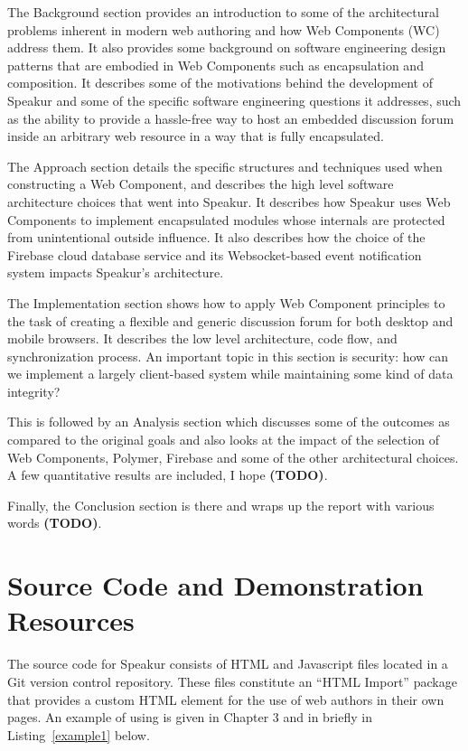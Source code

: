 The Background section provides an introduction to some of the architectural problems inherent in modern web authoring and how Web Components (WC) address them. 
It also provides some background on software engineering design patterns that are embodied in Web Components such as encapsulation and composition.
It describes some of the motivations behind the development of Speakur and some of the specific software engineering questions it addresses, such as the ability to provide a hassle-free way to host an embedded discussion forum inside an arbitrary web resource in a way that is fully encapsulated.

The Approach section details the specific structures and techniques used when constructing a Web Component, and describes the high level software architecture choices that went into Speakur. 
It describes how Speakur uses Web Components to implement encapsulated modules whose internals are protected from unintentional outside influence. 
It also describes how the choice of the Firebase cloud database service and its Websocket-based event notification system impacts Speakur's architecture.

The Implementation section shows how to apply Web Component principles to the task of creating a flexible and generic discussion forum for both desktop and mobile browsers. 
It describes the low level architecture, code flow, and synchronization process.
An important topic in this section is security: how can we implement a largely client-based system while maintaining some kind of data integrity?

This is followed by an Analysis section which discusses some of the outcomes as compared to the original goals and also looks at the impact of the selection of Web Components, Polymer, Firebase and some of the other architectural choices. 
A few quantitative results are included, I hope \textbf{(TODO)}.

Finally, the Conclusion section is there and wraps up the report with various words \textbf{(TODO)}. 

\section{Source Code and Demonstration Resources}
%

The source code for Speakur consists of HTML and Javascript files located in a Git version control repository. 
These files constitute an ``HTML Import'' package that provides a
\textbf{}
custom HTML element for the use of web authors in their own pages.
An example of using  is given in Chapter 3 and in briefly in Listing~\ref{example1} below.


